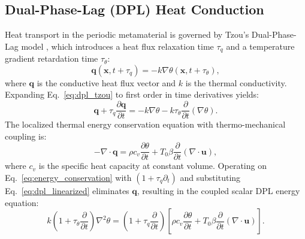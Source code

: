 \documentclass[11pt,a4paper]{article}
\begin{document}
\subsection{Dual-Phase-Lag (DPL) Heat Conduction}
Heat transport in the periodic metamaterial is governed by Tzou's Dual-Phase-Lag model \cite{tzou1995unified,tzou2014macro}, which introduces a heat flux relaxation time $\tau_q$ and a temperature gradient retardation time $\tau_\theta$:
\begin{equation}
\mathbf{q}(\mathbf{x}, t + \tau_q) = -k \nabla \theta(\mathbf{x}, t + \tau_\theta),
\label{eq:dpl_tzou}
\end{equation}
where $\mathbf{q}$ is the conductive heat flux vector and $k$ is the thermal conductivity. Expanding Eq.~\eqref{eq:dpl_tzou} to first order in time derivatives yields:
\begin{equation}
\mathbf{q} + \tau_q \frac{\partial \mathbf{q}}{\partial t} = -k \nabla \theta - k \tau_\theta \frac{\partial}{\partial t}(\nabla \theta).
\label{eq:dpl_linearized}
\end{equation}
The localized thermal energy conservation equation with thermo-mechanical coupling is:
\begin{equation}
-\nabla \cdot \mathbf{q} = \rho c_v \frac{\partial \theta}{\partial t} + T_0 \beta \frac{\partial}{\partial t}(\nabla \cdot \mathbf{u}),
\label{eq:energy_conservation}
\end{equation}
where $c_v$ is the specific heat capacity at constant volume. Operating on Eq.~\eqref{eq:energy_conservation} with $(1 + \tau_q \partial_t)$ and substituting Eq.~\eqref{eq:dpl_linearized} eliminates $\mathbf{q}$, resulting in the coupled scalar DPL energy equation:
\begin{equation}
k \left( 1 + \tau_\theta \frac{\partial}{\partial t} \right) \nabla^2 \theta = \left( 1 + \tau_q \frac{\partial}{\partial t} \right) \left[ \rho c_v \frac{\partial \theta}{\partial t} + T_0 \beta \frac{\partial}{\partial t}(\nabla \cdot \mathbf{u}) \right].
\label{eq:dpl_scalar_pde}
\end{equation}
\end{document}
